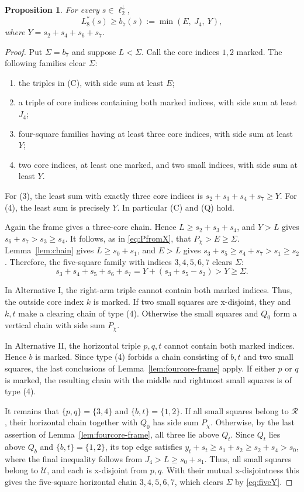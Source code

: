 \documentclass[12pt]{amsart}
\newtheorem{proposition}[theorem]{Proposition}
\theoremstyle{definition}
\theoremstyle{remark}
\numberwithin{equation}{section}
\numberwithin{figure}{section}
\numberwithin{table}{section}
\newcommand{\Pchi}{P_\chi}
\begin{document}
\begin{proposition}\label{prop:ell8}
For every $s\in\ell_2^\downarrow$,
\[
L_8^*(s)\ge b_7(s):=\min(E,\ J_4,\ Y),
\]
where $Y=s_2+s_4+s_6+s_7$.
\end{proposition}
\begin{proof}
Put \(\Sigma=b_7\) and suppose \(L<\Sigma\). Call the core indices
\(1,2\) marked. The following families clear $\Sigma$:
\begin{enumerate}
\item the triples in (C), with side sum at least \(E\);
\item a triple of core indices containing both marked indices, with side sum
at least \(J_4\);
\item four-square families having at least three core indices, with side
sum at least \(Y\);
\item two core indices, at least one marked, and two small indices, with side
sum at least \(Y\).
\end{enumerate}
For (3), the least sum with exactly three core indices is
\(s_2+s_3+s_4+s_7\ge Y\). For (4), the least sum is precisely \(Y\).
In particular (C) and (Q) hold.

Again the frame gives a three-core chain. Hence
\(L\ge s_2+s_3+s_4\), and \(Y>L\) gives \(s_6+s_7>s_3\ge s_4\).
It follows, as in \eqref{eq:PfromX}, that \(\Pchi>E\ge\Sigma\).
Lemma~\ref{lem:chain} gives \(L\ge s_0+s_1\), and \(E>L\) gives
\(s_3+s_5\ge s_4+s_7>s_1\ge s_2\).
Therefore, the five-square family with indices \(3,4,5,6,7\) clears $\Sigma$:
\begin{equation}\label{eq:fiveY}
s_3+s_4+s_5+s_6+s_7=Y+(s_3+s_5-s_2)>Y\ge\Sigma.
\end{equation}

In Alternative I, the right-arm triple cannot contain both marked indices.
Thus, the outside core index \(k\) is marked. If two small squares are
x-disjoint, they and \(k,t\) make a clearing chain of type (4). Otherwise
the small squares and \(Q_0\) form a vertical chain with side sum
\(\Pchi\).

In Alternative II, the horizontal triple \(p,q,t\) cannot contain
both marked indices. Hence \(b\) is marked. Since type (4) forbids a chain
consisting of \(b,t\) and two small squares, the last conclusions
of Lemma~\ref{lem:fourcore-frame} apply. If either \(p\) or \(q\) is marked,
the resulting chain with the middle and rightmost small squares is of
type (4).

It remains that \(\{p,q\}=\{3,4\}\) and
\(\{b,t\}=\{1,2\}\). If all small squares belong to \(\mathcal R\), their
horizontal chain together with \(Q_0\) has side sum \(\Pchi\).
Otherwise, by the last assertion of Lemma~\ref{lem:fourcore-frame}, all three
lie above \(Q_t\). Since \(Q_t\) lies above \(Q_b\) and \(\{b,t\}=\{1,2\}\),
its top edge satisfies
\(y_t+s_t\ge s_1+s_2\ge s_2+s_4>s_0\), where the final inequality follows from \(J_4>L\ge s_0+s_1\).
Thus, all small squares belong to \(\mathcal U\), and each is x-disjoint from
\(p,q\). With their mutual x-disjointness this gives the five-square
horizontal chain \(3,4,5,6,7\), which clears $\Sigma$ by \eqref{eq:fiveY}.
\end{proof}
\end{document}
